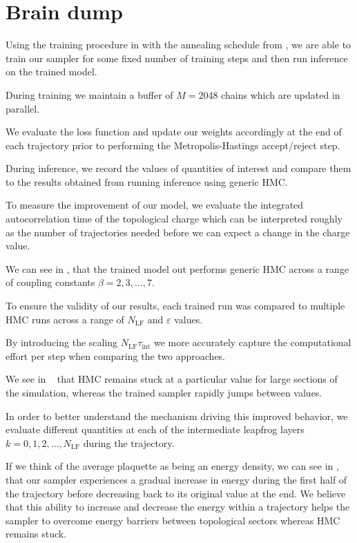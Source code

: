 \documentclass{article} %
\begin{document}
\section{\label{sec:braindump}Brain dump}
%
Using the training procedure in  with the annealing schedule from , we are able to train our sampler for some fixed number of training steps and then run inference on the trained model.
%

During training we maintain a buffer of \(M=2048\) chains which are updated in parallel.
%

We evaluate the loss function and update our weights accordingly at the end of each trajectory prior to performing the Metropolis-Hastings accept/reject step.
%

During inference, we record the values of quantities of interest and compare them to the results obtained from running inference using generic HMC.
%

To measure the improvement of our model, we evaluate the integrated autocorrelation time of the topological charge which can be interpreted roughly as the number of trajectories needed before we can expect a change in the charge value.
%

We can see in , that the trained model out performs generic HMC across a range of coupling constants \(\beta = 2, 3, \ldots, 7\).
%

To ensure the validity of our results, each trained run was compared to multiple HMC runs across a range of \(N_{\mathrm{LF}}\) and \(\varepsilon\) values.
%

By introducing the scaling \(N_{\mathrm{LF}} \tau_{\mathrm{int}}\) we more accurately capture the computational effort per step when comparing the two approaches.
%

We see in ~ that HMC remains stuck at a particular value for large sections of the simulation, whereas the trained sampler rapidly jumps between values.
%

In order to better understand the mechanism driving this improved behavior, we evaluate different quantities at each of the intermediate leapfrog layers \(k=0, 1, 2, \ldots, N_{\mathrm{LF}}\) during the trajectory.
%

If we think of the average plaquette as being an energy density, we can see in ,  that our sampler experiences a gradual increase in energy during the first half of the trajectory before decreasing back to its original value at the end.
%
We believe that this ability to increase and decrease the energy within a trajectory helps the sampler to overcome energy barriers between topological sectors whereas HMC remains stuck.
%
\end{document}
